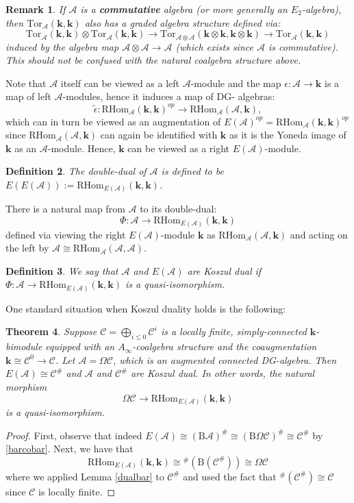 \documentclass{gtpart}
\newtheorem{thm}{Theorem}
\newtheorem{defi}[thm]{Definition}
\newtheorem{rem}[thm]{Remark}
\newcommand{\rhom}{\mathrm{RHom}}
\renewcommand{\k}{\mathbf{k}}
\newcommand{\A}{\mathscr{A}}
\renewcommand{\Bar}{\mathrm{B}}
\renewcommand{\C}{\mathscr{C}}
\begin{document}
\begin{rem} If $\A$ is a {\bf commutative} algebra (or more generally an $E_2$-algebra), then $\mathrm{Tor}_{\A}(\k,   \k)$ also has a graded
algebra structure defined via:
\[ \mathrm{Tor}_{\A}(\k,\k) \otimes \mathrm{Tor}_{\A}(\k, \k) \to
\mathrm{Tor}_{\A \otimes \A }(\k \otimes \k, \k \otimes \k) \to                     \mathrm{Tor}_{\A}(\k,\k) \]
induced by the algebra map $\A \otimes \A \to \A$ (which exists since $\A$ is       commutative). This should not be confused with the natural coalgebra structure      above.
\end{rem}

Note that $\A$ itself can be viewed as a left $\A$-module and the map
$\epsilon \colon \A \to \k$ is a map of left $\A$-modules, hence it induces a map of DG- algebras:
\[ \tilde{\epsilon}\colon \rhom_{\A}(\k,\k)^{op} \to \rhom_{\A}(\A,\k), \]
which can in turn be viewed as an augmentation of $E(\A)^{op} = \rhom_{\A}(\k,      \k)^{op}$ since
$\rhom_{\A}(\A,\k)$ can again be
identified with $\k$ as it is the Yoneda image of $\k$ as an $\A$-module. Hence,    $\k$ can be viewed
as a right $E(\A)$-module.
\begin{defi}
The double-dual of
$\A$ is defined to be $E(E(\A)):=\rhom_{E(\A)}(\k,\k)$.
\end{defi}

There is a natural map from $\A$ to its double-dual:
\[ \Phi\colon \A \to \rhom_{E(\A)}(\k,\k) \]
defined via viewing the right $E(\A)$-module $\k$ as $\rhom_{\A}(\A,\k)$ and acting on the left by $\A
\cong\rhom_{\A}(\A,\A)$.

\begin{defi} We say that $\A$ and $E(\A)$ are Koszul dual if $\Phi\colon \A \to \rhom_{E(\A)}(\k,\k)$ is a quasi-isomorphism.
\end{defi}

One standard situation when Koszul duality holds is the following:

\begin{thm} \label{doubledual} Suppose $\C = \bigoplus_{i \leq 0} \C^i$ is a locally finite, simply-connected $\k$-bimodule
    equipped with an $A_\infty$-coalgebra structure and the coaugmentation $\k \cong \C^0 \to \C$.
    Let $\A = \Omega \C$, which is an augmented connected DG-algebra. Then $E(\A) \cong \C^\#$ and $\A$ and $\C^\#$ are Koszul dual. In other words, the
    natural morphism 
    \[ \Omega \C \to  \mathrm{RHom}_{E(\A)}(\k,\k) \]
is a quasi-isomorphism.
\end{thm}
\begin{proof} First, observe that indeed $E(\A) \cong (\Bar \A)^\# \cong (\Bar \Omega \C)^\# \cong \C^\#$ by \eqref{barcobar}. Next, we have that 
    \[ \mathrm{RHom}_{E(\A)}(\k,\k) \cong \!^\# (\Bar (\C^\#)) \cong \Omega \C \]
    where we applied Lemma \ref{dualbar} to $\C^\#$ and used the fact that $^\#( \C^\#) \cong \C$ since $\C$ is locally finite. 
\end{proof}
\end{document}
